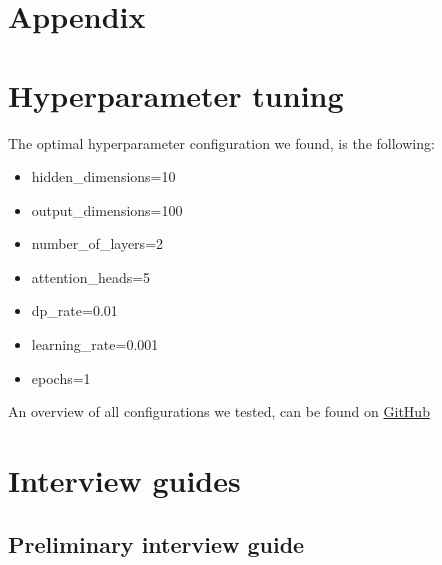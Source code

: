 \section{Appendix}
\appendix
\section{Hyperparameter tuning}
\label{app:hyperparameter}

The optimal hyperparameter configuration we found, is the following: 

\begin{itemize}
    \item hidden\_dimensions=10
    \item output\_dimensions=100
    \item number\_of\_layers=2
    \item attention\_heads=5
    \item dp\_rate=0.01
    \item learning\_rate=0.001
    \item epochs=1
\end{itemize}

An overview of all configurations we tested, can be found on \href{https://anonymous.4open.science/r/JRS_explanations-84D6/}{GitHub}

\newpage

\section{Interview guides}

\subsection{Preliminary interview guide}
\label{app:interview_guide}

